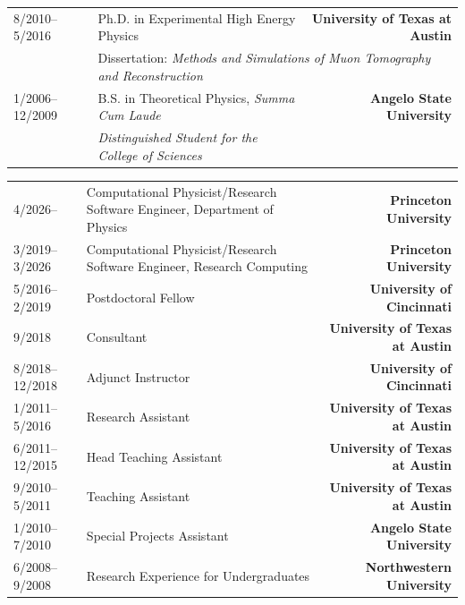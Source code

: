 \documentclass[10pt,letterpaper]{moderncv}
\begin{document}
\let\oldnullthing\null
\renewcommand{\null}{}
\makecvtitle
\renewcommand{\null}{\oldnullthing}
\vspace*{-10mm}


\begin{tabularx}{\textwidth}{p{1.1in}X>{\bfseries}r}
    8/2010--5/2016 & Ph.D. in Experimental High Energy Physics &  University of Texas at Austin \\
    & \multicolumn{2}{l}{Dissertation: \textit{Methods and Simulations of Muon Tomography and Reconstruction}} \\[1ex]
    1/2006--12/2009 & B.S. in Theoretical Physics, \textit{Summa Cum Laude} & Angelo State University \\
    & \textit{Distinguished Student for the College of Sciences} & \\
\end{tabularx}


\begin{tabularx}{\textwidth}{p{1.1in}X>{\bfseries}r}
    4/2026-- & Computational Physicist/Research Software Engineer, Department of Physics & Princeton University \\
    3/2019--3/2026 & Computational Physicist/Research Software Engineer, Research Computing & Princeton University \\
    5/2016--2/2019 & Postdoctoral Fellow &  University of Cincinnati \\
    9/2018 & Consultant & University of Texas at Austin \\
    8/2018--12/2018 & Adjunct Instructor &  University of Cincinnati \\
    1/2011--5/2016 & Research Assistant & University of Texas at Austin \\
    6/2011--12/2015 & Head Teaching Assistant & University of Texas at Austin \\
    9/2010--5/2011 & Teaching Assistant & University of Texas at Austin \\
    1/2010--7/2010 & Special Projects Assistant & Angelo State University \\
    6/2008--9/2008 & Research Experience for Undergraduates & Northwestern University \\
\end{tabularx}
\end{document}
